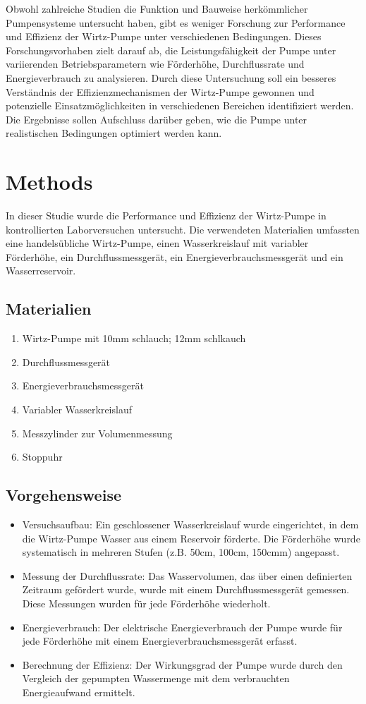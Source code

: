 \documentclass[12pt]{article}
\begin{document}
Obwohl zahlreiche Studien die Funktion und Bauweise herkömmlicher Pumpensysteme untersucht haben, gibt es weniger Forschung zur Performance und Effizienz der Wirtz-Pumpe unter verschiedenen Bedingungen. Dieses Forschungsvorhaben zielt darauf ab, die Leistungsfähigkeit der Pumpe unter variierenden Betriebsparametern wie Förderhöhe, Durchflussrate und Energieverbrauch zu analysieren. Durch diese Untersuchung soll ein besseres Verständnis der Effizienzmechanismen der Wirtz-Pumpe gewonnen und potenzielle Einsatzmöglichkeiten in verschiedenen Bereichen identifiziert werden. Die Ergebnisse sollen Aufschluss darüber geben, wie die Pumpe unter realistischen Bedingungen optimiert werden kann.

\section{Methods}
In dieser Studie wurde die Performance und Effizienz der Wirtz-Pumpe in kontrollierten Laborversuchen untersucht. Die verwendeten Materialien umfassten eine handelsübliche Wirtz-Pumpe, einen Wasserkreislauf mit variabler Förderhöhe, ein Durchflussmessgerät, ein Energieverbrauchsmessgerät und ein Wasserreservoir.

\subsection{Materialien}
\begin{enumerate}
\item Wirtz-Pumpe mit 10mm schlauch; 12mm schlkauch 
\item Durchflussmessgerät
\item Energieverbrauchsmessgerät
\item Variabler Wasserkreislauf
\item Messzylinder zur Volumenmessung
\item Stoppuhr
\end{enumerate}

\subsection{Vorgehensweise}
\begin{itemize}
\item Versuchsaufbau: Ein geschlossener Wasserkreislauf wurde eingerichtet, in dem die Wirtz-Pumpe Wasser aus einem Reservoir förderte. Die Förderhöhe wurde systematisch in mehreren Stufen (z.B. 50cm, 100cm, 150cmm) angepasst.
\item Messung der Durchflussrate: Das Wasservolumen, das über einen definierten Zeitraum gefördert wurde, wurde mit einem Durchflussmessgerät gemessen. Diese Messungen wurden für jede Förderhöhe wiederholt.
\item Energieverbrauch: Der elektrische Energieverbrauch der Pumpe wurde für jede Förderhöhe mit einem Energieverbrauchsmessgerät erfasst.
\item Berechnung der Effizienz: Der Wirkungsgrad der Pumpe wurde durch den Vergleich der gepumpten Wassermenge mit dem verbrauchten Energieaufwand ermittelt.
\end{itemize}
\end{document}
